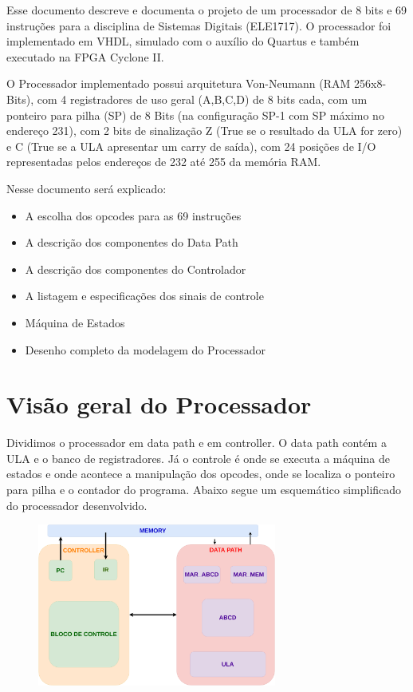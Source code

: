 \documentclass[12pt]{article}
\begin{document}
Esse documento descreve e documenta o projeto de um processador de 8 bits e 69 instruções para a disciplina de Sistemas Digitais (ELE1717). O processador foi implementado em VHDL, simulado com o auxílio do Quartus e também executado na FPGA Cyclone II. 

\bigskip

O Processador implementado possui arquitetura Von-Neumann (RAM 256x8-Bits), com 4 registradores de uso geral (A,B,C,D) de 8 bits cada, com um ponteiro para pilha (SP) de 8 Bits (na configuração SP-1 com SP máximo no endereço 231), com 2 bits de sinalização Z (True se o resultado da ULA for zero) e C (True se a ULA apresentar um carry de saída), com 24 posições de I/O representadas pelos endereços de 232 até 255 da memória RAM. 

\bigskip

Nesse documento será explicado:

\begin{itemize}
\item A escolha dos opcodes para as 69 instruções
\item A descrição dos componentes do Data Path
\item A descrição dos componentes do Controlador
\item A listagem e especificações dos sinais de controle
\item Máquina de Estados
\item Desenho completo da modelagem do Processador
\end{itemize}

\section{Visão geral do Processador}
Dividimos o processador em data path e em controller. O data path contém a ULA e o banco de registradores. Já o controle é onde se executa a máquina de estados e onde acontece a manipulação dos opcodes, onde se localiza o ponteiro para pilha e o contador do programa. Abaixo segue um esquemático simplificado do processador desenvolvido.

\begin{figure}[!htb]
\centering
\includegraphics[width=0.7\textwidth]{Figuras/geral.png}
\end{figure}
\end{document}
